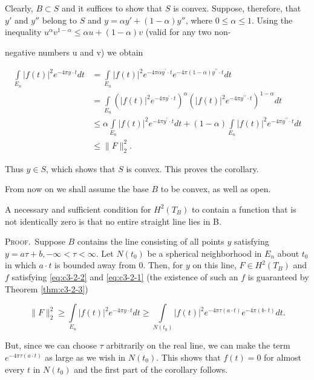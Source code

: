 Clearly, $B \subset S$ and it suffices to show that $S$ is convex. Suppose, therefore, that $y'$ and $y''$ belong to $S$ and $y = \alpha y' + (1 - \alpha)y''$, where $0 \leq \alpha \leq 1$. Using the inequality $u^{\alpha}v^{1 - \alpha} \leq \alpha u + (1 - \alpha)v$ (valid for any two non-

negative numbers u and v) we obtain

\[
\begin{aligned}\int\limits_{E_{n}}|f(t)|^{2}e^{-4\pi y\cdot t}dt&=\int\limits_{E_{n}}|f(t)|^{2}e^{-4\pi\alpha y^{\prime}\cdot t}e^{-4\pi(1-\alpha)y^{\prime \prime}\cdot t}dt\\&=\int\limits_{E_{n}}(|f(t)|^{2}e^{-4\pi y^{\prime}\cdot t})^\alpha(|f(t)|^{2}e^{-4\pi y^{\prime \prime}\cdot t})^{1-\alpha}dt\\&\leq\alpha\int\limits_{E_{n}}|f(t)|^{2}e^{-4\pi y^{\prime}\cdot t}dt+(1-\alpha)\int\limits_{E_{n}}|f(t)|^{2}e^{-4\pi y^{\prime \prime}\cdot t}dt\\&\leq\|F\|_{2}^{2}.\end{aligned}
\]

Thus $y \in S$, which shows that $S$ is convex. This proves the corollary.

From now on we shall assume the base $B$ to be convex, as well as open.

\begin{corollary}
\label{cor:c3-2-6}
A necessary and sufficient condition for $H^{2}(T_{B})$ to contain a function that is not identically zero is that no entire straight line lies in B.
\end{corollary}

\textsc{Proof.}\ Suppose $B$ contains the line consisting of all points $y$ satisfying $y = a\tau + b, -\infty < \tau < \infty$. Let $N(t_0)$ be a spherical neighborhood in $E_n$ about $t_0$ in which $a \cdot t$ is bounded away from 0. Then, for $y$ on this line, $F \in H^2(T_B)$ and $f$ satisfying \eqref{eq:c3-2-2} and \eqref{eq:c3-2-1} (the existence of such an $f$ is guaranteed by Theorem \ref{thm:c3-2-3})

\[
\|F\|_{2}^{2}\geq\int\limits_{E_{n}}|f(t)|^{2}e^{-4\pi y\cdot t}d t\geq\int\limits_{N(t_{0})}|f(t)|^{2}e^{-4\pi\tau(a\cdot t)}e^{-4\pi(b\cdot t)}d t.
\]

But, since we can choose $\tau$ arbitrarily on the real line, we can make the term $e^{-4\pi\tau(a\cdot t)}$ as large as we wish in $N(t_0)$. This shows that $f(t)=0$ for almost every $t$ in $N(t_0)$ and the first part of the corollary follows.

